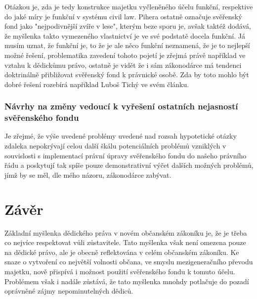 \documentclass{article}
\begin{document}
Otázkou je, zda je tedy konstrukce majetku vyčleněného účelu funkční, respektive do jaké míry je funkční v systému civil law. Pihera ostatně označuje svěřenský fond jako "nejpodivnější zvíře v lese", kterým beze sporu je, avšak taktéž dodává, že myšlenka takto vymezeného vlastnictví je ve své podstatě docela funkční. Já musím uznat, že funkční je, to že je ale něco funkční neznamená, že je to nejlepší možné řešení, problematika zavedení tohoto pojetí je zřejmá právě například ve vztahu k dědickůmu právo, ostatně je vidět že i sám zákonodárce má tendenci doktrinálně přibližovat svěřenský fond k právnické osobě. Zda by toto mohlo být dobré řešení rozebírá například Luboš Tichý ve svém článku.\\

\subsubsection{Návrhy na změny vedoucí k vyřešení ostatních nejasností svěřenského fondu}

Je zřejmé, že výše uvedené problémy uvedené nad rozsah hypotetické otázky zdaleka nepokrývají celou další škálu potenciálních problémů vzniklých v souvislosti s implementací právní úpravy svěřenského fondu do našeho právního řádu a poskytují tak spíše pouze demonstrativní výčet dalších možných problémů, jímž by se měl, dle mého názoru, zákonodárce zabývat.

\newpage

\section{Závěr}


Základní myšlenka dědického práva v novém občanském zákoníku je, že je třeba co nejvíce respektovat vůli zůstavitele. Tato myšlenka však není omezena pouze na dědické právo, ale je obecně reflektována v celém občanském zákoníku. Ke snaze o vytvoření co největší volnosti občana, ve smyslu mezigeneračního převodu majetku, nově přispívá i možnost použití svěřenského fondu k tomuto účelu. Problémem však i nadále zůstává, že tato myšlenka mnohdy potlačuje do pozadí oprávněné zájmy nepominutelných dědiců.\\
\end{document}
